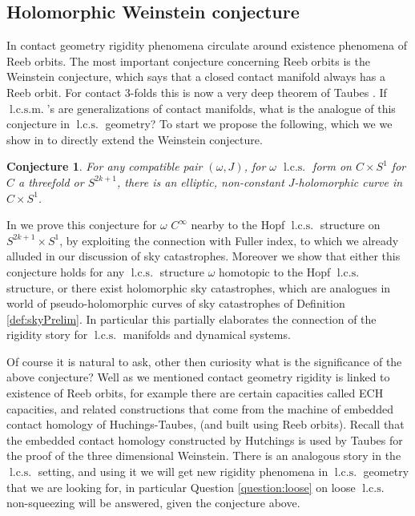 \documentclass{amsart}
\numberwithin{equation}{section}
\newtheorem{conjecture}{Conjecture}
\theoremstyle{definition}
\theoremstyle{remark}
\DeclareMathOperator{\lcs}{l.c.s.}
\DeclareMathOperator{\lcsm}{l.c.s.m.}
\begin{document}
\subsection {Holomorphic Weinstein conjecture} In contact geometry rigidity phenomena circulate around existence phenomena of Reeb orbits. The most important conjecture concerning Reeb orbits is the Weinstein conjecture, which says that a closed contact manifold always has a Reeb orbit. For contact 3-folds this is now a very deep theorem of Taubes \cite{citeTaubesWeinsteinconjecture}.
If $\lcsm$'s are generalizations of contact manifolds, what is the analogue of this conjecture in $\lcs$ geometry?
To start we propose the following, which we we show in \cite{citeSavelyevConformalSymplectic} to directly extend the Weinstein conjecture.
\begin{conjecture} \label{conj:Hol} For any compatible pair  $(\omega, J)$, for $\omega$ $\lcs$ form on $C \times S ^{1}  $ for $C$ a threefold or $S ^{2k+1} $, there is an elliptic, non-constant $J$-holomorphic curve in $C \times S ^{1}  $.
\end{conjecture}
In \cite{citeSavelyevConformalSymplectic} we prove this conjecture for $\omega$ $C ^{\infty} $ nearby to the Hopf $\lcs$ structure on $S ^{2k+1} \times S ^{1}  $, by exploiting the connection with Fuller index, to which we already alluded in our discussion of sky catastrophes. Moreover we show that either this conjecture holds for any $\lcs$ structure $\omega$ homotopic to the Hopf $\lcs$ structure, or there exist holomorphic sky catastrophes, which are analogues in world of pseudo-holomorphic curves of sky catastrophes of Definition \ref{def:skyPrelim}. 
In particular this partially elaborates the connection of the rigidity story for $\lcs$ manifolds and dynamical systems.


Of course it is natural to ask, other then curiosity what is the significance of the above conjecture? Well as we mentioned contact geometry rigidity is linked to existence of Reeb orbits, for example there are certain capacities called ECH capacities, and related constructions \cite{citeHutchingsBeyond} that come from the machine of embedded contact homology of Huchings-Taubes, (and built using Reeb orbits). Recall that the embedded contact homology 
constructed by Hutchings is used by Taubes for the proof of the three dimensional Weinstein.
There is an analogous story in the $\lcs$ setting, and using it we will get new rigidity phenomena in $\lcs$ geometry that we are looking for, in particular Question \ref{question:loose} on loose $\lcs$ non-squeezing will be answered, given the conjecture above.
\end{document}
